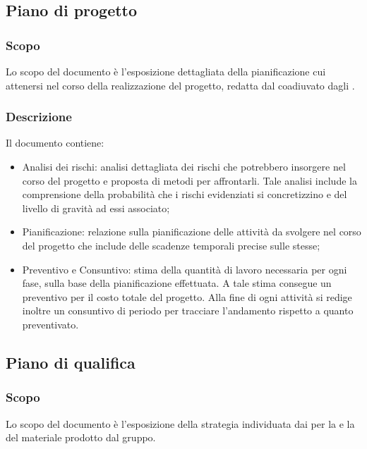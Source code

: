 \documentclass[./../NomeDocumento.tex]{subfiles}
\begin{document}

\subsection{Piano di progetto}

\subsubsection{Scopo}
Lo scopo del documento è l'esposizione dettagliata della pianificazione cui attenersi nel corso della realizzazione del progetto, redatta dal  coadiuvato dagli . 

\subsubsection{Descrizione}
Il documento contiene:
\begin{itemize}
    \item{Analisi dei rischi:} analisi dettagliata dei rischi che potrebbero insorgere nel corso del progetto e proposta di metodi per affrontarli. Tale analisi include la comprensione della probabilità che i rischi evidenziati si concretizzino e del livello di gravità ad essi associato;
    
    \item{Pianificazione:} relazione sulla pianificazione delle attività da svolgere nel corso del progetto che include delle scadenze temporali precise sulle stesse;
    
    \item{Preventivo e Consuntivo:} stima della quantità di lavoro necessaria per ogni fase, sulla base della pianificazione effettuata. A tale stima consegue un preventivo per il costo totale del progetto. Alla fine di ogni attività si redige inoltre un consuntivo di periodo per tracciare l’andamento rispetto a quanto preventivato.
\end{itemize}


\subsection{Piano di qualifica}

\subsubsection{Scopo}
Lo scopo del documento è l'esposizione della strategia individuata dai  per la  e la  del materiale prodotto dal gruppo. 
\end{document}
